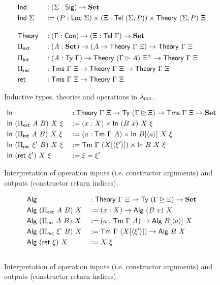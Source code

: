 \begin{figure}[H]
  \begin{alignat*}{2}
  & \Ind &&: (\Sigma : \Sig) \to \Set \\
  & \Ind\ \Sigma &&:= (P : \Loc\ \Sigma) \times (\Xi : \Tel\ (\Sigma, P)) \times \Theory\ (\Sigma, P)\ \Xi \\[1em]
  & \Theory &&: (\Gamma : \Con) \to (\Xi : \Tel\ \Gamma) \to \Set \\
  & \Pi_{\mta{ext}} &&: (A : \Set) \to (A \to \Theory\ \Gamma\ \Xi) \to \Theory\ \Gamma\ \Xi \\
  & \Pi_{\mta{int}} &&: (A : \Ty\ \Gamma) \to \Theory\ (\Gamma \rhd A)\ \Xi^+ \to \Theory\ \Gamma\ \Xi \\
  & \Pi_{\mta{rec}} &&: \Tms\ \Gamma\ \Xi \to \Theory\ \Gamma\ \Xi \to \Theory\ \Gamma\ \Xi \\
  & \mta{ret} &&: \Tms\ \Gamma\ \Xi \to \Theory\ \Gamma\ \Xi
  \end{alignat*}
  \caption{Inductive types, theories and operations in $\lambda_{\textsc{ind}}$.}
  \label{fig:lambdaind-inductive-theories}
\end{figure}

\begin{figure}[H]
  \begin{alignat*}{2}
  &\mta{In} &&: \Theory\ \Gamma\ \Xi \to \Ty\ (\Gamma \unrhd \Xi) \to \Tms\ \Gamma\ \Xi \to \Set \\
  &\mta{In}\ (\Pi_{\mta{ext}}\ A\ B)\ X\ \xi &&:= (x : X) \times \mta{In}\ (B\ x)\ X\ \xi \\
  &\mta{In}\ (\Pi_{\mta{int}}\ A\ B)\ X\ \xi &&:= (a : \Tm\ \Gamma\ A) \times \mta{In}\ B [\langle a \rangle]\ X\ \xi \\
  &\mta{In}\ (\Pi_{\mta{rec}}\ \xi'\ B)\ X\ \xi &&:= \Tm\ \Gamma\ (X [\langle \xi' \rangle]) \times \mta{In}\ B\ X\ \xi \\
  &\mta{In}\ (\mta{ret}\ \xi')\ X\ \xi &&:= \xi = \xi'
  \end{alignat*}
  \caption{Interpretation of operation inputs (i.e. constructor arguments) and outputs (constructor return indices).}
  \label{fig:lambdaind-operation-interp}
\end{figure}

\begin{figure}[H]
  \begin{alignat*}{2}
  &\mta{Alg} &&: \Theory\ \Gamma\ \Xi \to \Ty\ (\Gamma \unrhd \Xi) \to \Set \\
  &\mta{Alg}\ (\Pi_{\mta{ext}}\ A\ B)\ X &&:= (x : X) \to \mta{Alg}\ (B\ x)\ X \\
  &\mta{Alg}\ (\Pi_{\mta{int}}\ A\ B)\ X &&:= (a : \Tm\ \Gamma\ A) \to \mta{Alg}\ B [\langle a \rangle]\ X \\
  &\mta{Alg}\ (\Pi_{\mta{rec}}\ \xi'\ B)\ X &&:= \Tm\ \Gamma\ (X [\langle \xi' \rangle]) \to \mta{Alg}\ B\ X \\
  &\mta{Alg}\ (\mta{ret}\ \xi)\ X &&:= X\ \xi \\[1em]
  \end{alignat*}
  \caption{Interpretation of operation inputs (i.e. constructor arguments) and outputs (constructor return indices).}
\end{figure}


